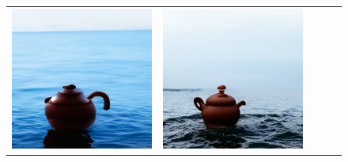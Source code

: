 \begin{figure}[!ht]
\begin{tabular}[t]{c c c c c}
    \includegraphics[width=\xwidth]{cp2/figures/dreambooth/teapot/c128_checkpoint_199.png} &
    \includegraphics[width=\xwidth]{cp2/figures/dreambooth/teapot/c160_checkpoint_399.png} &

\end{tabular}
\end{figure}
